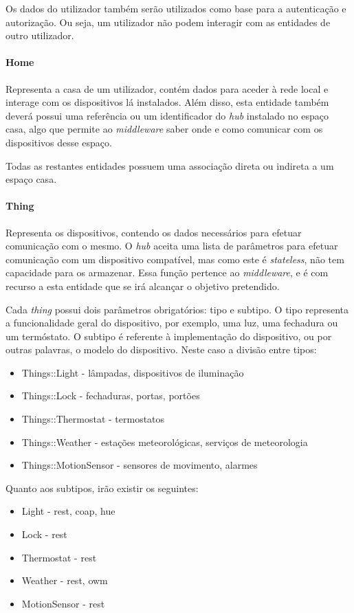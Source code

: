 Os dados do utilizador também serão utilizados como base para a autenticação e autorização. Ou seja, um utilizador não podem interagir com as entidades de outro utilizador.

\paragraph*{Home}
Representa a casa de um utilizador, contém dados para aceder à rede local e interage com os dispositivos lá instalados. Além disso, esta entidade também deverá possui uma referência ou um identificador do \textit{hub} instalado no espaço casa, algo que permite ao \textit{middleware} saber onde e como comunicar com os dispositivos desse espaço.

Todas as restantes entidades possuem uma associação direta ou indireta a um espaço casa.

\paragraph*{Thing}
Representa os dispositivos, contendo os dados necessários para efetuar comunicação com o mesmo. O \textit{hub} aceita uma lista de parâmetros para efetuar comunicação com um dispositivo compatível, mas como este é \textit{stateless}, não tem capacidade para os armazenar. Essa função pertence ao \textit{middleware}, e é com recurso a esta entidade que se irá alcançar o objetivo pretendido.

Cada \textit{thing} possui dois parâmetros obrigatórios: tipo e subtipo. O tipo representa a funcionalidade geral do dispositivo, por exemplo, uma luz, uma fechadura ou um termóstato. O subtipo é referente à implementação do dispositivo, ou por outras palavras, o modelo do dispositivo. Neste caso a divisão entre tipos:

\begin{itemize}
    \item Things::Light - lâmpadas, dispositivos de iluminação
    \item Things::Lock - fechaduras, portas, portões
    \item Things::Thermostat - termostatos
    \item Things::Weather - estações meteorológicas, serviços de meteorologia
    \item Things::MotionSensor - sensores de movimento, alarmes
\end{itemize}

\newpage

Quanto aos subtipos, irão existir os seguintes:
\begin{itemize}
    \item Light - rest, coap, hue
    \item Lock - rest
    \item Thermostat - rest
    \item Weather - rest, owm
    \item MotionSensor - rest
\end{itemize}

